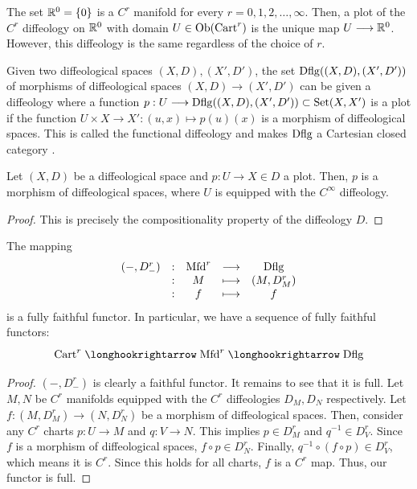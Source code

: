 \documentclass[11pt]{amsart}
\begin{document}
\begin{exm}
The set $\bR^0 = \set{0}$ is a $C^r$ manifold for every $r = 0, 1, 2, \dots, \infty$.
Then, a plot of the $C^r$ diffeology on $\mathbb{R}^0$ with domain $U \in \Ob{\Cart^r}$
is the unique map $U \to \bR^0$. However, this diffeology is the same regardless of
the choice of $r$.
\end{exm}

\begin{exm}
Given two diffeological spaces $(X, D), (X', D')$, the set $\mathrm{Dflg}((X, D), (X', D'))$
of morphisms of diffeological spaces $(X, D) \to (X', D')$ can be given a diffeology
where a function $p : U \to \Dflg((X, D), (X', D')) \subset \Set(X, X')$
is a plot if the function $U \times X \to X' : (u, x) \mapsto p(u)(x)$ is a morphism of
diffeological spaces. This is called the functional diffeology and makes $\mathrm{Dflg}$ a Cartesian closed
category \cite[\S 1.60]{Diff}.
\end{exm}

\begin{prop}\label{prop:plot-dflg-morphism}
Let $(X, D)$ be a diffeological space and $p : U \to X \in D$ a plot. Then,
$p$ is a morphism of diffeological spaces, where $U$ is equipped with the $C^\infty$ diffeology.
\end{prop}
\begin{proof}
This is precisely the compositionality property of the diffeology $D$.
\end{proof}

\begin{prop}\label{prop:Cr-Dflg-incl}
The mapping
\[\begin{array}{ccccc}
(-, D^r_{-}) &:& \Mfd^r &\to& \Dflg \\
             &:& M &\mapsto& (M, D^r_M) \\
             &:& f &\mapsto& f
\end{array}\]
is a fully faithful functor. In particular, we have a sequence of fully faithful functors:
\[
\Cart^r \hto \Mfd^r \hto \Dflg
\]
\end{prop}
\begin{proof}
$(-, D^r_{-})$ is clearly a faithful functor. It remains to see that it is full.
Let $M, N$ be $C^r$ manifolds equipped with the $C^r$ diffeologies $D_M, D_N$ respectively.
Let $f : (M, D^r_M) \to (N, D^r_N)$ be a morphism of diffeological spaces.
Then, consider any $C^r$ charts $p : U \to M$ and $q : V \to N$. This implies $p \in D^r_M$ and
$q^{-1} \in D^r_V$. Since $f$ is a morphism of diffeological spaces, $f \circ p \in D^r_N$.
Finally, $q^{-1} \circ (f \circ p) \in D^r_V$, which means it is $C^r$. Since this holds for all
charts, $f$ is a $C^r$ map. Thus, our functor is full.
\end{proof}
\end{document}
